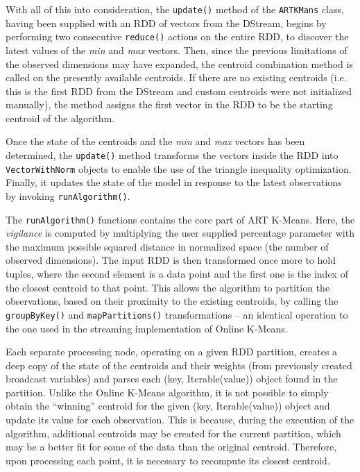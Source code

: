 \documentclass{l4proj}
\begin{document}
With all of this into consideration, the \texttt{update()} method of the \texttt{ARTKMans} class, having been supplied with an RDD of vectors from the DStream, begins by performing two consecutive \texttt{reduce()} actions on the entire RDD, to discover the latest values of the \textit{min} and \textit{max} vectors. Then, since the previous limitations of the observed dimensions may have expanded, the centroid combination method is called on the presently available centroids. If there are no existing centroids (i.e. this is the first RDD from the DStream and custom centroids were not initialized manually), the method assigns the first vector in the RDD to be the starting centroid of the algorithm.

Once the state of the centroids and the \textit{min} and \textit{max} vectors has been determined, the \texttt{update()} method transforms the vectors inside the RDD into \texttt{VectorWithNorm} objects to enable the use of the triangle inequality optimization\cite{Triangle}. Finally, it updates the state of the model in response to the latest observations by invoking \texttt{runAlgorithm()}.

The \texttt{runAlgorithm()} functions contains the core part of ART K-Means. Here, the \textit{vigilance} is computed by multiplying the user supplied percentage parameter with the maximum possible squared distance in normalized space (the number of observed dimensions). The input RDD is then transformed once more to hold tuples, where the second element is a data point and the first one is the index of the closest centroid to that point. This allows the algorithm to partition the observations, based on their proximity to the existing centroids, by calling the \texttt{groupByKey()} and \texttt{mapPartitions()} transformations -- an identical operation to the one used in the streaming implementation of Online K-Means.

Each separate processing node, operating on a given RDD partition, creates a deep copy of the state of the centroids and their weights (from previously created broadcast variables) and parses each (key, Iterable(value)) object found in the partition. Unlike the Online K-Means algorithm, it is not possible to simply obtain the ``winning'' centroid for the given (key, Iterable(value)) object and update its value for each observation. This is because, during the execution of the algorithm, additional centroids may be created for the current partition, which may be a better fit for some of the data than the original centroid. Therefore, upon processing each point, it is necessary to recompute its closest centroid. 
\end{document}
